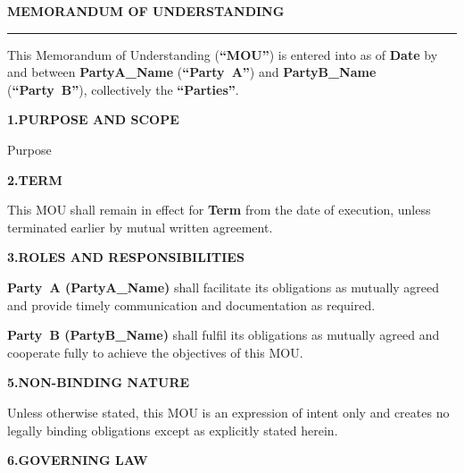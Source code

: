 \documentclass[9.5pt]{article}
\begin{document}
\vspace*{18pt}

{\fontsize{14pt}{17pt}\selectfont\bfseries\color{t2ldark}MEMORANDUM OF UNDERSTANDING}\par\vspace{2pt}
{\color{refgold}\rule{\linewidth}{1pt}}\par\vspace{8pt}

{\fontsize{9.5pt}{13.5pt}\selectfont\color{refcharcoal}

This Memorandum of Understanding (\textbf{``MOU''}) is entered into as of
\textbf{{{Date}}} by and between \textbf{{{PartyA_Name}}} (\textbf{``Party~A''})
and \textbf{{{PartyB_Name}}} (\textbf{``Party~B''}), collectively the
\textbf{``Parties''}.

\vspace{5pt}
\textbf{\color{t2ldark}1.\enspace PURPOSE AND SCOPE}

{{Purpose}}

\vspace{5pt}
\textbf{\color{t2ldark}2.\enspace TERM}

This MOU shall remain in effect for \textbf{{{Term}}} from the date of
execution, unless terminated earlier by mutual written agreement.

\vspace{5pt}
\textbf{\color{t2ldark}3.\enspace ROLES AND RESPONSIBILITIES}

\textbf{Party~A ({{PartyA_Name}})} shall facilitate its obligations as mutually
agreed and provide timely communication and documentation as required.

\textbf{Party~B ({{PartyB_Name}})} shall fulfil its obligations as mutually
agreed and cooperate fully to achieve the objectives of this MOU.


\vspace{5pt}
\textbf{\color{t2ldark}5.\enspace NON-BINDING NATURE}

Unless otherwise stated, this MOU is an expression of intent only and creates
no legally binding obligations except as explicitly stated herein.

\vspace{5pt}
\textbf{\color{t2ldark}6.\enspace GOVERNING LAW}

}
\end{document}

